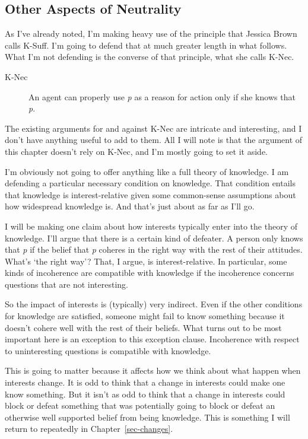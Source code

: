 \documentclass[
  12pt,
  letterpaper,
]{scrbook}
\begin{document}
\subsection{Other Aspects of Neutrality}\label{sec-neutrality-k-nec}

As I've already noted, I'm making heavy use of the principle that
Jessica Brown calls K-Suff. I'm going to defend that at much greater
length in what follows. What I'm not defending is the converse of that
principle, what she calls K-Nec.

\begin{description}
\item[K-Nec]
An agent can properly use \emph{p} as a reason for action only if she
knows that \emph{p}.
\end{description}

The existing arguments for and against K-Nec are intricate and
interesting, and I don't have anything useful to add to them. All I will
note is that the argument of this chapter doesn't rely on K-Nec, and I'm
mostly going to set it aside.

I'm obviously not going to offer anything like a full theory of
knowledge. I am defending a particular necessary condition on knowledge.
That condition entails that knowledge is interest-relative given some
common-sense assumptions about how widespread knowledge is. And that's
just about as far as I'll go.

I will be making one claim about how interests typically enter into the
theory of knowledge. I'll argue that there is a certain kind of
defeater. A person only knows that \emph{p} if the belief that \emph{p}
coheres in the right way with the rest of their attitudes. What's `the
right way'? That, I argue, is interest-relative. In particular, some
kinds of incoherence are compatible with knowledge if the incoherence
concerns questions that are not interesting.

So the impact of interests is (typically) very indirect. Even if the
other conditions for knowledge are satisfied, someone might fail to know
something because it doesn't cohere well with the rest of their beliefs.
What turns out to be most important here is an exception to this
exception clause. Incoherence with respect to uninteresting questions is
compatible with knowledge.

This is going to matter because it affects how we think about what
happen when interests change. It is odd to think that a change in
interests could make one know something. But it isn't as odd to think
that a change in interests could block or defeat something that was
potentially going to block or defeat an otherwise well supported belief
from being knowledge. This is something I will return to repeatedly in
Chapter~\ref{sec-changes}.
\end{document}
